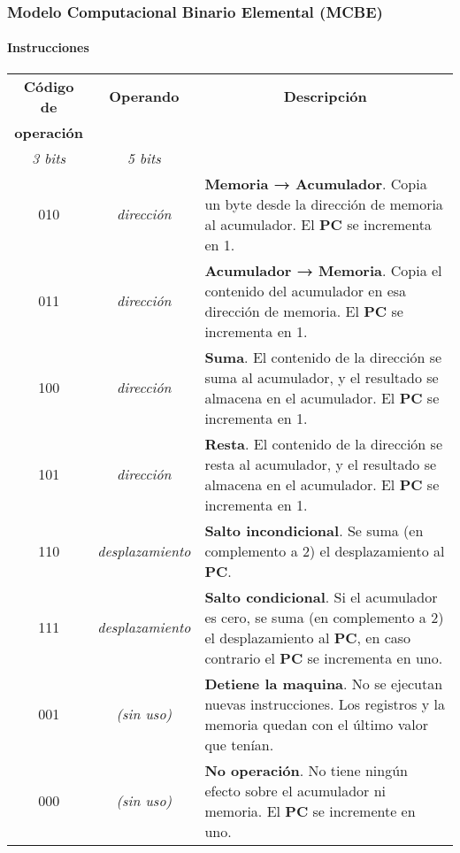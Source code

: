 \documentclass[11pt,a4paper,spanish]{beamer}
\begin{document}
\begin{frame}
    \frametitle{Modelo Computacional Binario Elemental (MCBE)}
    \framesubtitle{Instrucciones}

\tiny
\begin{tabularx}{\textwidth}{c|c|X}

    \textbf{Código de} & \textbf{Operando} &
    \multicolumn{1}{c}{\textbf{Descripción}} \\

    \textbf{operación} & & \\

    \emph{3 bits} & \emph{5 bits} & \\
    \hline
    \hline

    010 & \emph{dirección} & \textbf{Memoria → Acumulador}. Copia un byte
    desde la dirección de memoria al acumulador. El \textbf{PC} se incrementa
    en 1.\\ \hline

    011 & \emph{dirección} & \textbf{Acumulador → Memoria}. Copia el contenido
    del acumulador en esa dirección de memoria. El \textbf{PC} se incrementa
    en 1.\\ \hline

    100 & \emph{dirección} & \textbf{Suma}. El contenido de la dirección se
    suma al acumulador, y el resultado se almacena en el acumulador. El
    \textbf{PC} se incrementa en 1.\\ \hline

    101 & \emph{dirección} & \textbf{Resta}. El contenido de la dirección se
    resta al acumulador, y el resultado se almacena en el acumulador. El
    \textbf{PC} se incrementa en 1.\\ \hline

    110 & \emph{desplazamiento} & \textbf{Salto incondicional}. Se
    suma (en complemento a 2) el desplazamiento al \textbf{PC}. \\ \hline

    111 & \emph{desplazamiento} & \textbf{Salto condicional}. Si
    el acumulador es cero, se suma (en complemento a 2) el desplazamiento al
    \textbf{PC}, en caso contrario el \textbf{PC} se incrementa en uno. \\
    \hline

    001 & \emph{(sin uso)} & \textbf{Detiene la maquina}. No se
    ejecutan nuevas instrucciones. Los registros y la memoria quedan con el
    último valor que tenían. \\ \hline

    000 & \emph{(sin uso)} & \textbf{No operación}. No tiene
    ningún efecto sobre el acumulador ni memoria. El \textbf{PC} se incremente
    en uno. \\

\end{tabularx}
\end{frame}
\end{document}
